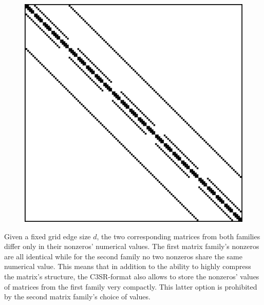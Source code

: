     \begin{figure}[H]
        \centering
        \begin{minipage}{0.45\textwidth}
          \centering
          
        \end{minipage}\hfill
        \begin{minipage}{0.45\textwidth}
          \centering
          \includegraphics[width=1.0\textwidth]{fig/laplacian_example.png} %
        \end{minipage}
        \label{fig:laplacian-example-reprint}
    \end{figure}

    Given a fixed grid edge size $d$, the two corresponding matrices from both families differ only in their nonzeros'
    numerical values. The first matrix family's nonzeros are all identical while for the second family no two nonzeros
    share the same numerical value. This means that in addition to the ability to highly compress the matrix's
    structure, the C3SR-format also allows to store the nonzeros' values of matrices from the first family very
    compactly. This latter option is prohibited by the second matrix family's choice of values.

